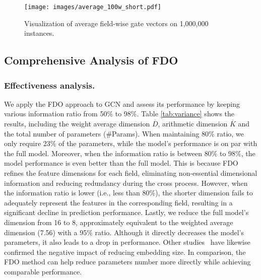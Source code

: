 \documentclass[sigconf]{acmart}
\begin{document}
\begin{figure}[t]
\setlength{\abovecaptionskip}{0.2cm}
\setlength{\belowcaptionskip}{-0.2cm}
\centering
\texttt{[image: images/average\_100w\_short.pdf]}
\caption{Visualization of average field-wise gate vectors on 1,000,000 instances.}
\label{fig:100w_gate values}
\end{figure}




\subsection{Comprehensive Analysis of FDO}
\label{exp:dimension optimization}

\subsubsection{Effectiveness analysis.} We apply the FDO approach to GCN and assess its performance by keeping various information ratio from 50\% to 98\%. Table \ref{tab:variance} shows the results, including the weight average dimension $\overline{D}$, arithmetic dimension $\overline{K}$ and the total number of parameters (\#Params). When maintaining 80\% ratio, we only require 23\% of the parameters, while the model's performance is on par with the full model. Moreover, when the information ratio is between 80\% to 98\%, the model performance is even better than the full model. This is because FDO refines the feature dimensions for each field, eliminating non-essential dimensional information and reducing redundancy during the cross process. However, when the information ratio is lower (i.e., less than 80\%), the shorter dimension fails to adequately represent the features in the corresponding field, resulting in a significant decline in prediction performance. Lastly, we reduce the full model's dimension from 16 to 8, approximately equivalent to the weighted average dimension (7.56) with a 95\% ratio. Although it directly decreases the model's parameters, it also leads to a drop in performance. Other studies~\cite{song2019autoint, he2017ncf, he2017neural, sun2020generic} have likewise confirmed the negative impact of reducing embedding size. In comparison, the FDO method can help reduce parameters number more directly while achieving comparable performance.
\end{document}
